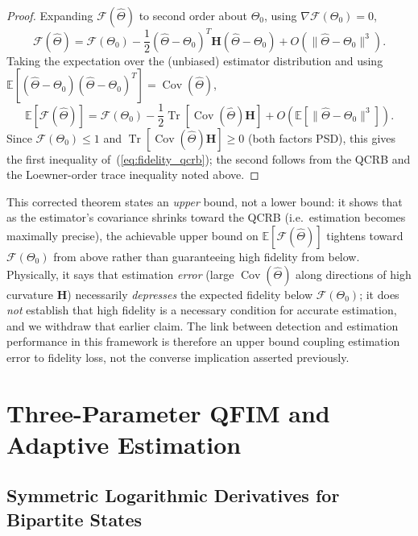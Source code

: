 \documentclass[journal]{IEEEtran}
\DeclareMathOperator{\Tr}{Tr}
\DeclareMathOperator{\Cov}{Cov}
\begin{document}
\begin{proof}
Expanding $\mathcal F(\hat\Theta)$ to second order about $\Theta_0$, using $\nabla\mathcal F(\Theta_0)=0$,
\begin{equation}
\mathcal F(\hat\Theta) = \mathcal F(\Theta_0) - \frac12(\hat\Theta-\Theta_0)^T\mathbf H(\hat\Theta-\Theta_0) + O(\|\hat\Theta-\Theta_0\|^3).
\end{equation}
Taking the expectation over the (unbiased) estimator distribution and using $\mathbb E[(\hat\Theta-\Theta_0)(\hat\Theta-\Theta_0)^T]=\Cov(\hat\Theta)$,
\begin{equation}
\mathbb E[\mathcal F(\hat\Theta)] = \mathcal F(\Theta_0) - \frac12\Tr[\Cov(\hat\Theta)\mathbf H] + O(\mathbb E[\|\hat\Theta-\Theta_0\|^3]).
\end{equation}
Since $\mathcal F(\Theta_0)\leq1$ and $\Tr[\Cov(\hat\Theta)\mathbf H]\geq0$ (both factors PSD), this gives the first inequality of~(\ref{eq:fidelity_qcrb}); the second follows from the QCRB and the Loewner-order trace inequality noted above.
\end{proof}

This corrected theorem states an \emph{upper} bound, not a lower bound: it shows that as the estimator's covariance shrinks toward the QCRB (i.e.\ estimation becomes maximally precise), the achievable upper bound on $\mathbb E[\mathcal F(\hat\Theta)]$ tightens toward $\mathcal F(\Theta_0)$ from above rather than guaranteeing high fidelity from below. Physically, it says that estimation \emph{error} (large $\Cov(\hat\Theta)$ along directions of high curvature $\mathbf H$) necessarily \emph{depresses} the expected fidelity below $\mathcal F(\Theta_0)$; it does \emph{not} establish that high fidelity is a necessary condition for accurate estimation, and we withdraw that earlier claim. The link between detection and estimation performance in this framework is therefore an upper bound coupling estimation error to fidelity loss, not the converse implication asserted previously.


\section{Three-Parameter QFIM and Adaptive Estimation}\label{sec:qfim}

\subsection{Symmetric Logarithmic Derivatives for Bipartite States}
\end{document}
